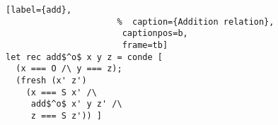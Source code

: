 \begin{figure}[!t]
  \centering
  \begin{minipage}{\columnwidth}
    \begin{lstlisting}[label={add},
                      %  caption={Addition relation},
                       captionpos=b,
                       frame=tb]
let rec add$^o$ x y z = conde [
  (x === O /\ y === z);
  (fresh (x' z')
    (x === S x' /\
     add$^o$ x' y z' /\
     z === S z')) ]
    \end{lstlisting}
  \end{minipage}
\end{figure}